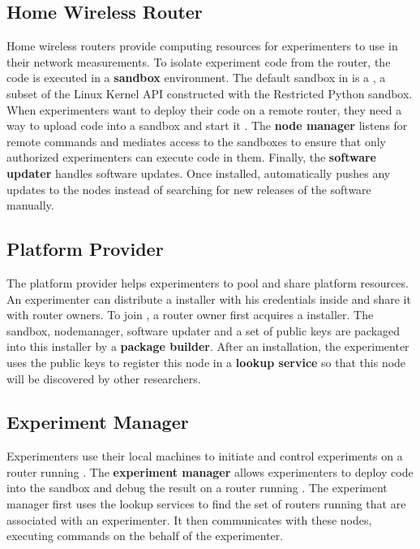 \subsection{Home Wireless Router}
Home wireless routers provide computing resources for experimenters to use in their
 network measurements. To isolate experiment code from the router,
 the code is executed in a \textbf{sandbox} environment. The default sandbox
 in \sysname is a \sandboxname, a subset of the Linux Kernel API constructed with
 the Restricted Python sandbox. When experimenters want to deploy their code on a
  remote router, they need a way to upload code into a sandbox and start it
  . The \textbf{node manager} listens for remote commands and mediates access to
  the sandboxes to ensure that only authorized experimenters can execute code in them.
   Finally, the \textbf{software updater} handles software updates. Once installed,
   automatically pushes any updates to the nodes instead of searching for new releases
    of the software manually.

\subsection{Platform Provider}
The platform provider helps experimenters to pool and share platform resources.
An experimenter can distribute a \sysname installer with his credentials inside
and share it with router owners. To join \sysname, a router owner first acquires
 a \sysname installer. The sandbox, nodemanager, software updater and a set of
 public keys are packaged into this installer by a \textbf{package builder}.
 After an installation, the experimenter uses the public keys to register this node
  in a \textbf{lookup service} so that this node will be discovered by other
  researchers.

\subsection{Experiment Manager}
Experimenters use their local machines to initiate and control experiments
 on a router running \sysname. The \textbf{experiment manager} allows experimenters
 to deploy code into the sandbox and debug the result on a router running \sysname.
 The experiment manager first uses the lookup services to find the set of routers
  running \sysname that are associated with an experimenter. It then communicates
   with these nodes, executing commands on the behalf of the experimenter.

